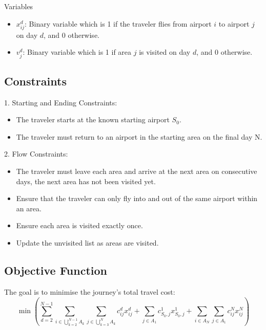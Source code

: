 Variables
\begin{itemize}
    \item $x_{ij}^d$: Binary variable which is 1 if the traveler flies from airport $i$ to airport $j$ on day $d$, and 0 otherwise.
    \item $v_j^d$: Binary variable which is 1 if area $j$ is visited on day $d$, and 0 otherwise.
\end{itemize}

\subsection*{Constraints}
1. Starting and Ending Constraints:
   \begin{itemize}
       \item The traveler starts at the known starting airport $S_{0}$.
       \item The traveler must return to an airport in the starting area on the final day N.
   \end{itemize}

2. Flow Constraints:
   \begin{itemize}
       \item The traveler must leave each area and arrive at the next area on consecutive days, the next area has not been visited yet.
       \item Ensure that the traveler can only fly into and out of the same airport within an area.
       \item Ensure each area is visited exactly once.
       \item Update the unvisited list as areas are visited.
   \end{itemize}

\subsection*{Objective Function}
The goal is to minimise the journey's total travel cost:
\[\min \left( \sum_{d=2}^{N-1} \sum_{i \in \bigcup\limits_{k=2}^{N-1} A_k} \sum_{j \in \bigcup\limits_{k=3}^{N} A_k} c_{ij}^d x_{ij}^d + \sum_{j \in A_1} c_{S_0,j}^1 x_{S_0,j}^1 + \sum_{i \in A_N} \sum_{j \in A_1} c_{ij}^N x_{ij}^N \right)\]

